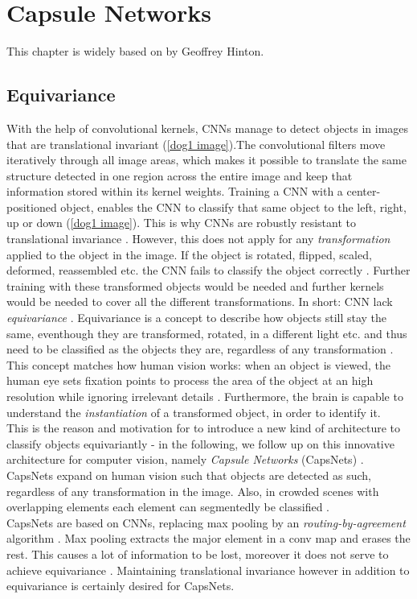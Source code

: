\documentclass{article}
\begin{document}
{\newpage
\section{Capsule Networks}
\label{section:capsnet}

This chapter is widely based on \cite{hinton17} by Geoffrey Hinton.

\subsection{Equivariance}
With the help of convolutional kernels, CNNs manage to detect objects in images that are translational invariant (\ref{dog1 image}).The convolutional filters move iteratively through all image areas, which makes it possible to translate the same structure detected in one region across the entire image and keep that information stored within its kernel weights. Training a CNN with a center-positioned object, enables the CNN to classify that same object to the left, right, up or down (\ref{dog1 image}). This is why CNNs are robustly resistant to translational invariance \cite{Goodfellow-et-al-2016}. However, this does not apply for any \textit{transformation} applied to the object in the image. If the object is rotated, flipped, scaled, deformed, reassembled etc. the CNN fails to classify the object correctly \cite{hinton17}. Further training with these transformed objects would be needed and further kernels would be needed to cover all the different transformations. In short: CNN lack \textit{equivariance} \cite{hinton17}. Equivariance is a concept to describe how objects still stay the same, eventhough they are transformed, rotated, in a different light etc. and thus need to be classified as the objects they are, regardless of any transformation \cite{hinton17}. This concept matches how human vision works: when an object is viewed, the human eye sets fixation points to process the area of the object at an high resolution while ignoring irrelevant details \cite{hinton17}. Furthermore, the brain is capable to understand the \textit{instantiation} of a transformed object, in order to identify it.\\
This is the reason and motivation for \cite{hinton17} to introduce a new kind of architecture to classify objects equivariantly - in the following, we follow up on this innovative architecture for computer vision, namely \textit{Capsule Networks} (CapsNets) \cite{hinton17}. CapsNets expand on human vision such that objects are detected as such, regardless of any transformation in the image. Also, in crowded scenes with overlapping elements each element can segmentedly be classified \cite{hinton17}.\\
CapsNets are based on CNNs, replacing max pooling by an \textit{routing-by-agreement} algorithm \cite{hinton17}. Max pooling extracts the major element in a conv map and erases the rest. This causes a lot of information to be lost, moreover it does not serve to achieve equivariance \cite{hinton17}. Maintaining translational invariance however in addition to equivariance is certainly desired for CapsNets.



}
\end{document}
